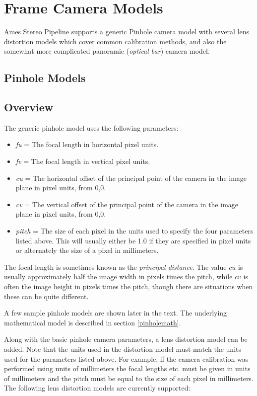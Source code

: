\chapter{Frame Camera Models}

Ames Stereo Pipeline supports a generic Pinhole camera model with
several lens distortion models which cover common calibration methods,
and also the somewhat more complicated panoramic (\textit{optical bar})
camera model.

\section{Pinhole Models}
\label{pinholemodels}

\section{Overview}

The generic pinhole model uses the following parameters:

\begin{itemize}{}
\item  \textit{fu} = The focal length in horizontal pixel units.
\item  \textit{fv} = The focal length in vertical pixel units.
\item  \textit{cu} = The horizontal offset of the principal 
point of the camera in the image plane in pixel units, from 0,0.
\item  \textit{cv} = The vertical offset of the principal 
point of the camera in the image plane in pixel units, from 0,0.
\item  \textit{pitch} = The size of each pixel in the units used to specify
the four parameters listed above.  This will usually either be 1.0 if they
are specified in pixel units or alternately the size of a pixel in millimeters.
\end{itemize}

The focal length is sometimes known as the \textit{principal
distance}. The value $cu$ is usually approximately half the image width in
pixels times the pitch, while $cv$ is often the image height in pixels
times the pitch, though there are situations when these can be quite different.

A few sample pinhole models are shown later in the text. The underlying mathematical model
is described in section \ref{pinholemath}.

Along with the basic pinhole camera parameters, a lens distortion model
can be added.  Note that the units used in the distortion model must
match the units used for the parameters listed above.  For example, if the
camera calibration was performed using units of millimeters the focal lengths etc. must be given in
units of millimeters and the pitch must be equal to the size of each pixel in millimeters.
The following lens distortion models are currently supported:

